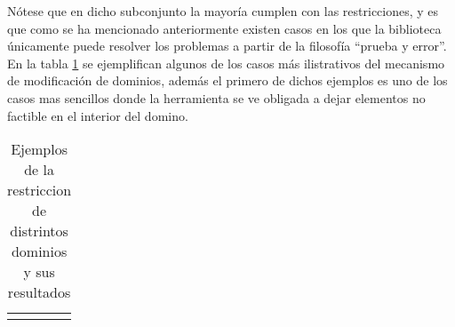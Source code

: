 Nótese que en dicho subconjunto la mayoría cumplen con las restricciones, y es que como se ha mencionado anteriormente existen
casos en los que la biblioteca únicamente puede resolver los problemas a partir de la filosofía “prueba y error”. En la 
tabla \ref{chap2:examples} se ejemplifican algunos de los casos más ilistrativos del mecanismo de modificación de dominios, además el primero de dichos
ejemplos es uno de los casos mas sencillos donde la herramienta se ve obligada a dejar elementos no factible en el interior del
domino.

\setlength\LTleft{-3cm}
\setlength\LTright{-5cm}
\begin{longtable}{ | p{6cm} | p{2cm}| p{3.5cm}| p{6.5cm}|  }
    \caption{Ejemplos de la restriccion de distrintos dominios y sus resultados }\label{chap2:examples} \\
    \endfirsthead
    \hline
    \endhead
    \hline
    \endfoot
    \hline
    \endlastfoot


\end{longtable}
